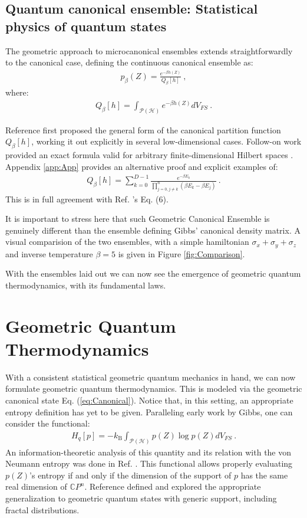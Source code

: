 \documentclass[draft,nofootinbib,pre,twocolumn,showpacs,showkeys,groupaddress,preprintnumbers,floatfix]{revtex4-1}
\newcommand{\kB}{k_\text{B}}
\newcommand{\1}{\mathbbm{1}}
\newcommand{\intP}{\int_{\mathcal{P}(\mathcal{H})} \!\!\!\!\!\!\!\!\!}
\newcommand{\CP}[1]{\mathbb{C}P^{#1}}
\begin{document}
\subsection{Quantum canonical ensemble: Statistical physics of quantum states}

The geometric approach to microcanonical ensembles extends straightforwardly
to the canonical case, defining the continuous canonical ensemble as:
\begin{align}
p_{\beta}(Z) = \frac{e^{-\beta h(Z)}}{Q_\beta[h]}
  ~,\label{eq:Canonical}
\end{align}
where:
\begin{align*}
Q_\beta[h] = \intP e^{-\beta h(Z)}  dV_{FS} 
  ~.
\end{align*}

Reference \cite{Brody1998} first proposed the general form of the canonical 
partition function $Q_\beta[h]$, working it out explicitly in several
low-dimensional cases. Follow-on work provided an exact formula valid for
arbitrary finite-dimensional Hilbert spaces \cite{Brody2007}. Appendix
\ref{app:App} provides an alternative proof and explicit examples of:
\begin{align}
Q_\beta[h] = \sum_{k=0}^{D-1}
  \frac{ e^{-\beta E_k} }{\prod_{j=0, j \neq k}^n (\beta E_k - \beta E_j)}
  ~.
\label{eq:GeoPartFunc}
\end{align}
This is in full agreement with Ref. \cite{Brody2007}'s Eq. (6). 

It is important to stress here that such Geometric Canonical Ensemble is 
genuinely different than the ensemble defining Gibbs' canonical density matrix. 
A visual comparision of the two ensembles, with a simple hamiltonian $\sigma_x+\sigma_y+\sigma_z$
and inverse temperature $\beta=5$ is given in Figure \ref{fig:Comparison}.

With the ensembles laid out we can now see the emergence of geometric quantum
thermodynamics, with its fundamental laws.

\section{Geometric Quantum Thermodynamics}\label{sec:GQT}

With a consistent statistical geometric quantum mechanics in hand, we can now
formulate geometric quantum thermodynamics. This is modeled via the geometric
canonical state Eq. (\ref{eq:Canonical}). Notice that, in this setting, an
appropriate entropy definition has yet to be given. Paralleling early work by
Gibbs, one can consider the functional:
\begin{align*}
H_q\left[ p\right] = - \kB \intP p(Z) \log p(Z) dV_{FS}
  ~.
\end{align*}
An information-theoretic analysis of this quantity and its relation with the
von Neumann entropy was done in Ref. \cite{Brody2000}. This functional allows
properly evaluating $p(Z)$'s entropy if and only if the dimension of the
support of $p$ has the same real dimension of $\CP{n}$. Reference
\cite{Anza21a} defined and explored the appropriate generalization to
geometric quantum states with generic support, including fractal
distributions.
\end{document}
